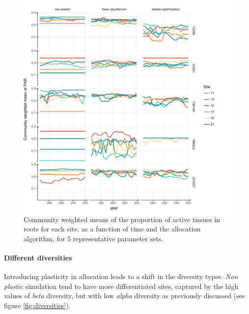 

\begin{figure}%
    \includegraphics[width=1\linewidth]{./2_PP/Figures/Comm/comm_variability_lines.pdf}%
  \caption[Spatial and temporal variability of the CWMs of the PAR]{Community weighted means of the proportion of active tissues in roots for each site, as a function of time and the allocation algorithm, for 5 representative parameter sets.}
  \label{fig:comm_strat}
\end{figure}


\paragraph{Different diversities}

Introducing plasticity in allocation leads to a shift in the diversity types. \textit{Non plastic} simulation tend to have more differentiated sites, captured by the high values of \textit{beta} diversity, but with low \textit{alpha} diversity as previously discussed (see figure \ref{fig:diversities}). 

